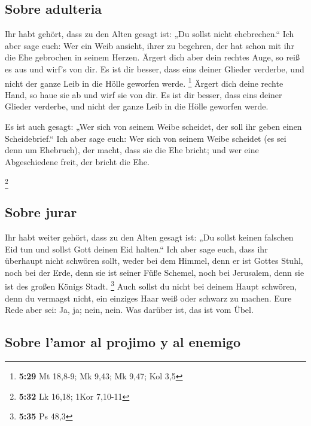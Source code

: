 \hypertarget{sobre-adulteria}{%
\subsection{Sobre adulteria}\label{sobre-adulteria}}

 Ihr habt gehört, dass zu den Alten gesagt ist: „Du
sollst nicht ehebrechen.``  Ich aber sage euch: Wer ein
Weib ansieht, ihrer zu begehren, der hat schon mit ihr die Ehe gebrochen
in seinem Herzen.  Ärgert dich aber dein rechtes Auge, so
reiß es aus und wirf's von dir. Es ist dir besser, dass eins deiner
Glieder verderbe, und nicht der ganze Leib in die Hölle geworfen werde.
\footnote{\textbf{5:29} Mt 18,8-9; Mk 9,43; Mk 9,47; Kol 3,5}
 Ärgert dich deine rechte Hand, so haue sie ab und wirf
sie von dir. Es ist dir besser, dass eins deiner Glieder verderbe, und
nicht der ganze Leib in die Hölle geworfen werde.

 Es ist auch gesagt: „Wer sich von seinem Weibe scheidet,
der soll ihr geben einen Scheidebrief.``  Ich aber sage
euch: Wer sich von seinem Weibe scheidet (es sei denn um Ehebruch), der
macht, dass sie die Ehe bricht; und wer eine Abgeschiedene freit, der
bricht die Ehe.

\footnote{\textbf{5:32} Lk 16,18; 1Kor 7,10-11}

\hypertarget{sobre-jurar}{%
\subsection{Sobre jurar}\label{sobre-jurar}}

 Ihr habt weiter gehört, dass zu den Alten gesagt ist:
„Du sollst keinen falschen Eid tun und sollst Gott deinen Eid halten.``
 Ich aber sage euch, dass ihr überhaupt nicht schwören
sollt, weder bei dem Himmel, denn er ist Gottes Stuhl, 
noch bei der Erde, denn sie ist seiner Füße Schemel, noch bei Jerusalem,
denn sie ist des großen Königs Stadt. \footnote{\textbf{5:35} Ps 48,3}
 Auch sollst du nicht bei deinem Haupt schwören, denn du
vermagst nicht, ein einziges Haar weiß oder schwarz zu machen.
 Eure Rede aber sei: Ja, ja; nein, nein. Was darüber ist,
das ist vom Übel.

\hypertarget{sobre-lamor-al-projimo-y-al-enemigo}{%
\subsection{Sobre l'amor al projimo y al
enemigo}\label{sobre-lamor-al-projimo-y-al-enemigo}}

